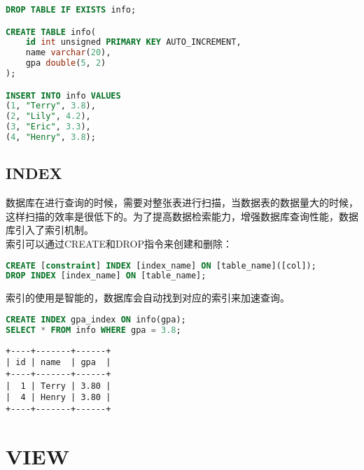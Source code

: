 \documentclass[12pt, openany, oneside]{book}
\begin{document}

\begin{lstlisting}[language=SQL]
DROP TABLE IF EXISTS info;

CREATE TABLE info(
    id int unsigned PRIMARY KEY AUTO_INCREMENT,
    name varchar(20),
    gpa double(5, 2)
);

INSERT INTO info VALUES
(1, "Terry", 3.8),
(2, "Lily", 4.2),
(3, "Eric", 3.3),
(4, "Henry", 3.8);
\end{lstlisting}

\vspace{0.5cm}

\section{INDEX}

数据库在进行查询的时候，需要对整张表进行扫描，当数据表的数据量大的时候，这样扫描的效率是很低下的。为了提高数据检索能力，增强数据库查询性能，数据库引入了索引机制。\\

索引可以通过CREATE和DROP指令来创建和删除：

\vspace{-0.5cm}

\begin{lstlisting}[language=SQL]
CREATE [constraint] INDEX [index_name] ON [table_name]([col]);
DROP INDEX [index_name] ON [table_name];
\end{lstlisting}

索引的使用是智能的，数据库会自动找到对应的索引来加速查询。\\


\begin{lstlisting}[language=SQL]
CREATE INDEX gpa_index ON info(gpa);
SELECT * FROM info WHERE gpa = 3.8;
\end{lstlisting}

\begin{tcolorbox}
	\begin{verbatim}
+----+-------+------+
| id | name  | gpa  |
+----+-------+------+
|  1 | Terry | 3.80 |
|  4 | Henry | 3.80 |
+----+-------+------+
	\end{verbatim}
\end{tcolorbox}

\newpage

\chapter{VIEW}
\end{document}
